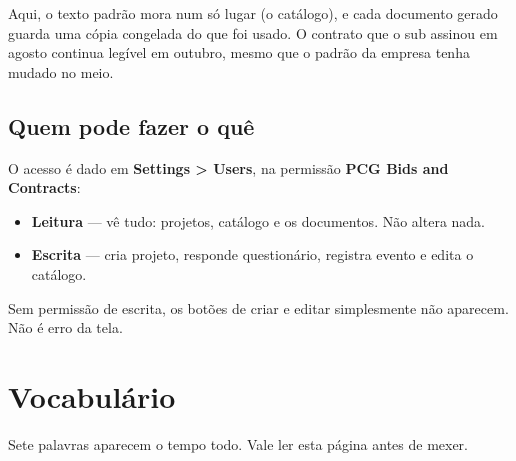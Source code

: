 \documentclass[11pt,a4paper]{article}
\newcommand{\ui}[1]{\textbf{\textsf{#1}}}
\begin{document}
Aqui, o texto padrão mora num só lugar (o catálogo), e cada documento gerado
guarda uma cópia congelada do que foi usado. O contrato que o sub assinou em
agosto continua legível em outubro, mesmo que o padrão da empresa tenha mudado
no meio.

\subsection{Quem pode fazer o quê}

O acesso é dado em \ui{Settings > Users}, na permissão \ui{PCG Bids and Contracts}:

\begin{itemize}
  \item \textbf{Leitura} — vê tudo: projetos, catálogo e os documentos. Não
  altera nada.
  \item \textbf{Escrita} — cria projeto, responde questionário, registra evento
  e edita o catálogo.
\end{itemize}

Sem permissão de escrita, os botões de criar e editar simplesmente não aparecem.
Não é erro da tela.

\section{Vocabulário}

Sete palavras aparecem o tempo todo. Vale ler esta página antes de mexer.
\end{document}
